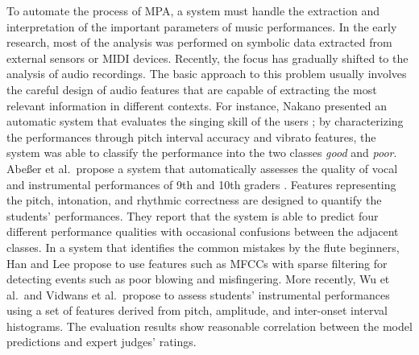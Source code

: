 \documentclass[conference]{IEEEtran}
\begin{document}
To automate the process of MPA, a system must handle the extraction and interpretation of the important parameters of music performances. In the early research, most of the analysis was performed on symbolic data extracted from external sensors or MIDI devices. Recently, the focus has gradually shifted to the analysis of audio recordings. The basic approach to this problem usually involves the careful design of audio features that are capable of extracting the most relevant information in different contexts. For instance, Nakano presented an automatic system that evaluates the singing skill of the users \cite{Nakano2006a}; by characterizing the performances through pitch interval accuracy and vibrato features, the system was able to classify the performance into the two classes \textit{good} and \textit{poor}. 
Abe{\ss}er et al.\ propose a system that automatically assesses the quality of vocal and instrumental performances of 9th and 10th graders \cite{Abeßer2013}. Features representing the pitch, intonation, and rhythmic correctness are designed to quantify the students' performances. They report that the system is able to predict four different performance qualities with occasional confusions between the adjacent classes. 
In a system that identifies the common mistakes by the flute beginners, Han and Lee propose to use features such as MFCCs with sparse filtering for detecting events such as poor blowing and misfingering\cite{Han2014}. %
More recently, Wu et al.\  and Vidwans et al.\ propose to assess students' instrumental performances using a set of features derived from pitch, amplitude, and inter-onset interval histograms\cite{Wu2016, Vidwans2017}. The evaluation results show reasonable correlation between the model predictions and expert judges' ratings. 
\end{document}
